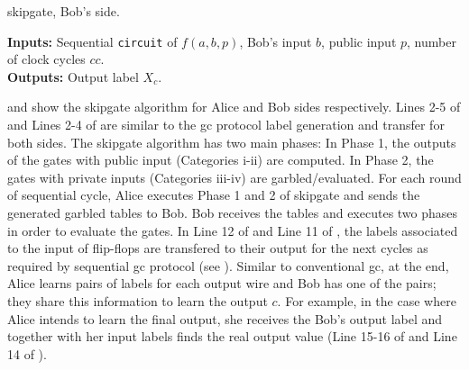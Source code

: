 \begin{algorithm}[]
\caption{\gls{skipgate}, Bob's side.}\label{alg:bob}
\textbf{Inputs:} Sequential \texttt{circuit} of $f(a,b,p)$, Bob's input $b$, public input $p$, number of clock cycles $cc$.\\
\textbf{Outputs:} Output label $X_c$.\\
\begin{algorithmic}[1]
\ENDFOR
{}
\end{algorithmic}
\end{algorithm}

 and  show the \gls{skipgate} algorithm for Alice and Bob sides respectively.
Lines 2-5 of  and Lines 2-4 of  are similar to the \acrshort{gc} protocol label generation and transfer for both sides.
The \gls{skipgate} algorithm has two main phases:
In Phase 1, the outputs of the gates with public input (Categories i-ii) are computed.
In Phase 2, the gates with private inputs (Categories iii-iv) are  garbled/evaluated.
For each round of sequential cycle, Alice executes Phase 1 and 2 of \gls{skipgate} and sends the generated garbled tables to Bob.
Bob receives the tables and executes two phases in order to evaluate the gates.
In Line 12 of  and Line 11 of , the labels associated to the input of flip-flops are transfered to their output for the next cycles as required by sequential \acrshort{gc} protocol (see ).
Similar to conventional \acrshort{gc}, at the end, Alice learns pairs of labels for each output wire and Bob has one of the pairs; they share this information to learn the output $c$.
For example, in the case where Alice intends to learn the final output, she receives the Bob's output label and together with her input labels finds the real output value (Line 15-16 of  and Line 14 of ).

